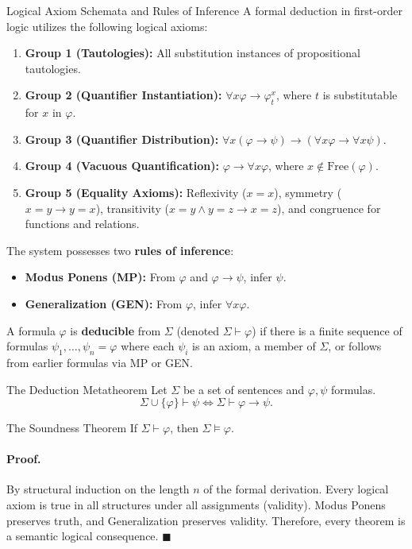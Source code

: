 \begin{definitionbox}{Logical Axiom Schemata and Rules of Inference}
A formal deduction in first-order logic utilizes the following logical axioms:
\begin{enumerate}[leftmargin=1.4em,itemsep=2pt]
  \item \textbf{Group 1 (Tautologies):} All substitution instances of propositional tautologies.
  \item \textbf{Group 2 (Quantifier Instantiation):} $\forall x \varphi \to \varphi_t^x$, where $t$ is substitutable for $x$ in $\varphi$.
  \item \textbf{Group 3 (Quantifier Distribution):} $\forall x (\varphi \to \psi) \to (\forall x \varphi \to \forall x \psi)$.
  \item \textbf{Group 4 (Vacuous Quantification):} $\varphi \to \forall x \varphi$, where $x \notin \mathrm{Free}(\varphi)$.
  \item \textbf{Group 5 (Equality Axioms):} Reflexivity ($x = x$), symmetry ($x = y \to y = x$), transitivity ($x = y \land y = z \to x = z$), and congruence for functions and relations.
\end{enumerate}
The system possesses two \textbf{rules of inference}:
\begin{itemize}[leftmargin=1.2em,itemsep=1pt]
  \item \textbf{Modus Ponens (MP):} From $\varphi$ and $\varphi \to \psi$, infer $\psi$.
  \item \textbf{Generalization (GEN):} From $\varphi$, infer $\forall x \varphi$.
\end{itemize}
A formula $\varphi$ is \textbf{deducible} from $\Sigma$ (denoted $\Sigma \vdash \varphi$) if there is a finite sequence of formulas $\psi_1, \dots, \psi_n = \varphi$ where each $\psi_i$ is an axiom, a member of $\Sigma$, or follows from earlier formulas via MP or GEN.
\end{definitionbox}

\begin{theorembox}{The Deduction Metatheorem}
Let $\Sigma$ be a set of sentences and $\varphi, \psi$ formulas.
\[
\Sigma \cup \{\varphi\} \vdash \psi \iff \Sigma \vdash \varphi \to \psi.
\]
\end{theorembox}

\begin{theorembox}{The Soundness Theorem}
If $\Sigma \vdash \varphi$, then $\Sigma \models \varphi$.
\end{theorembox}
\paragraph{Proof.}
By structural induction on the length $n$ of the formal derivation. Every logical axiom is true in all structures under all assignments (validity). Modus Ponens preserves truth, and Generalization preserves validity. Therefore, every theorem is a semantic logical consequence. $\blacksquare$

